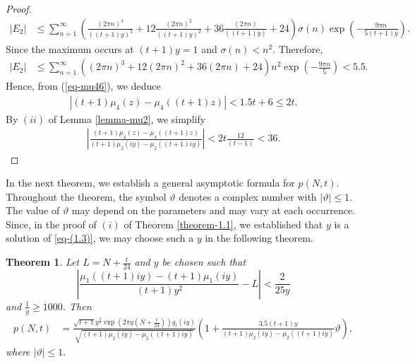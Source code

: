 \documentclass[11pt]{amsart}
\theoremstyle{plain}
\newtheorem{theorem}{Theorem}[section]
\numberwithin{equation}{section}
\begin{document}
\begin{proof}
\begin{align*}
				|E_{2}| &\le\sum_{n=1}^{\infty}\left(\frac{(2\pi n)^{3}}{((t+1)y)^{3}}+12\frac{(2\pi n)^{2}}{((t+1)y)^{2}}+36\frac{(2\pi n)}{((t+1)y)}+24\right)\sigma(n)\exp\left(-\frac{9\pi n}{5(t+1)y}\right).  
			\end{align*}
			Since the maximum occurs at $(t+1)y = 1$ and $\sigma(n)<n^{2}$. Therefore,
			\begin{align*}
				|E_2|&\le\sum_{n=1}^{\infty}\left((2\pi n)^{3}+12(2\pi n)^{2}+36(2\pi n)+24\right)n^{2}\exp\left(-\frac{9\pi n}{5}\right)<5.5.
			\end{align*}
			Hence, from (\ref{eq-mu46}), we deduce
			\begin{align*}
				|(t+1)\mu_{4}(z)-\mu_{4}((t+1)z)|<1.5t+6\le 2t. 
			\end{align*}
			By $(ii)$ of Lemma \ref{lemma-mu2}, we simplify
			\begin{align*}
				\left|\frac{(t+1)\mu_{4}(z)-\mu_{4}((t+1)z)}{(t+1)\mu_{2}(iy)-\mu_{2}((t+1)iy)}\right|<2t\frac{12}{(t-1)}<36.    
			\end{align*}
		\end{proof}
		In the next theorem, we establish a general asymptotic formula for $p(N,t)$. Throughout the theorem, the symbol $\vartheta$ denotes a complex number with $|\vartheta| \le 1$. The value of $\vartheta$ may depend on the parameters and may vary at each occurrence. Since, in the proof of $(i)$ of Theorem \ref{theorem-1.1}, we established that $y$ is a solution of \eqref{eq-(1.3)}, we may choose such a $y$ in the following theorem.
		\begin{theorem}\label{theorem-main}
			Let $L=N+\frac{t}{24}$ and $y$ be chosen such that 
			\begin{equation}\label{eq-assumL}
				\left|\frac{\mu_{1}((t+1)iy)-(t+1)\mu_{1}(iy)}{(t+1)y^{2}}- L  \right|<\frac{2}{25y}   
			\end{equation}
			and $\frac{1}{y}\ge1000$. Then
			\begin{align*}
				p(N,t)&=\frac{\sqrt{t+1}y^{\frac{3}{2}}\exp\left(2\pi y\left(N+\frac{t}{24}\right)\right)g_{t}(iy)}{\sqrt{(t+1)\mu_{2}(iy)-\mu_{2}((t+1)iy)}}\left(1+ \frac{3.5(t+1)y}{(t+1)\mu_{2}(iy)-\mu_{2}((t+1)iy)}\vartheta\right),  
			\end{align*}
			where $|\vartheta|\le 1.$
		\end{theorem}
\end{document}

